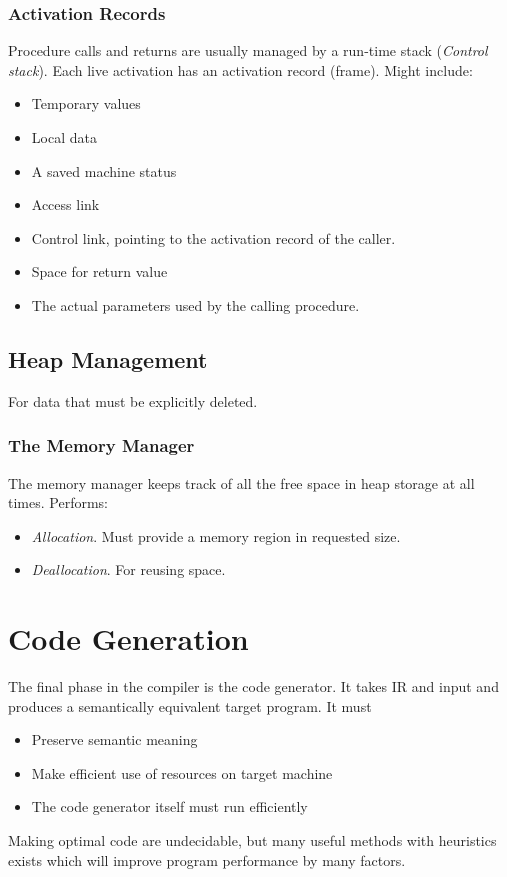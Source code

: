 \documentclass{article}
\begin{document}
\subsubsection{Activation Records} %
\label{ssub:Activation Records}
Procedure calls and returns are usually managed by a run-time stack (\emph{Control stack}). Each live activation has an activation record (frame). Might include:
\begin{itemize}
	\item Temporary values
	\item Local data
	\item A saved machine status
	\item Access link
	\item Control link, pointing to the activation record of the caller.
	\item Space for return value
	\item The actual parameters used by the calling procedure.
\end{itemize}

\subsection{Heap Management} %
\label{sub:Heap Management}
For data that must be explicitly deleted.
\subsubsection{The Memory Manager} %
\label{ssub:The Memory Manager}
The memory manager keeps track of all the free space in heap storage at all times. Performs:
\begin{itemize}
	\item \emph{Allocation}. Must provide a memory region in requested size.
	\item \emph{Deallocation}. For reusing space.
\end{itemize}


\section{Code Generation} %
\label{sec:Code Generation}
The final phase in the compiler is the code generator. It takes IR and input and produces a semantically equivalent target program. It must
\begin{itemize}
	\item Preserve semantic meaning
	\item Make efficient use of resources on target machine
	\item The code generator itself must run efficiently
\end{itemize}
Making optimal code are undecidable, but many useful methods with heuristics exists which will improve program performance by many factors.
\end{document}
